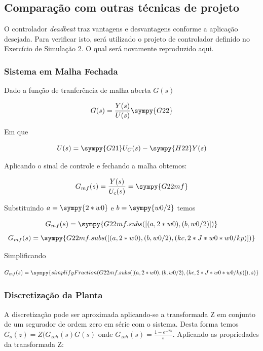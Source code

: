 \documentclass[a4paper,11pt]{article}
\begin{document}
\subsection{Comparação com outras técnicas de projeto}

O controlador \textit{deadbeat} traz vantagens e desvantagens conforme a aplicação desejada. Para verificar isto, será utilizado o projeto de controlador definido no Exercício de Simulação 2. O qual será novamente reproduzido aqui.

\subsubsection{Sistema em Malha Fechada}

Dado a função de tranferência de malha aberta $G(s)$

\begin{equation}
    G(s) = \frac{Y(s)}{U(s)} \sympy{G22}
\end{equation}

Em que

\begin{equation}
    U(s) = \sympy{G21}U_C(s) - \sympy{H22}Y(s)
\end{equation}

Aplicando o sinal de controle e fechando a malha obtemos:

$$G_{mf}(s) = \frac{Y(s)}{U_c(s)} = \sympy{G22mf}$$

Substituindo $a = \sympy{2*w0}$ e $b = \sympy{w0/2}$ temos

$$
G_{mf}(s) = \sympy{G22mf.subs([(a,2*w0),(b,w0/2)])}
$$
$$
G_{mf}(s) = \sympy{G22mf.subs([(a,2*w0),(b,w0/2),(kc,2*J*w0*w0/kp)])}
$$

Simplificando

\begin{equation}
    G_{mf}(s) = \sympy{simplifyFraction(G22mf.subs([(a,2*w0),(b,w0/2),(kc,2*J*w0*w0/kp)]),s)}
\end{equation}

\subsubsection{Discretização da Planta}

A discretização pode ser aproximada aplicando-se a transformada Z em conjunto de um segurador de ordem zero em série com o sistema. Desta forma temos $G_o(z) = Z(G_{zoh}(s)G(s)$ onde $G_{zoh}(s) = \frac{1-e^{-Ts}}{s}$. Aplicando as propriedades da transformada Z:
\end{document}
